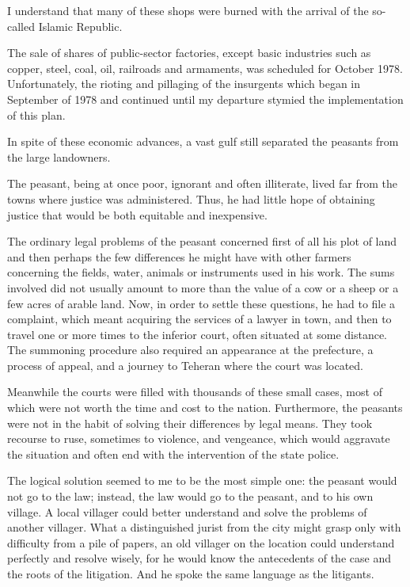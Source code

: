 I understand that many of these shops were burned with the arrival of the so-called Islamic Republic. 

The sale of shares of public-sector factories, except basic industries such as copper, steel, coal, oil, railroads and armaments, was scheduled for October 1978. Unfortunately, the rioting and pillaging of the insurgents which began in September of 1978 and continued until my departure stymied the implementation of this plan. 


In spite of these economic advances, a vast gulf still separated the peasants from the large landowners. 


The peasant, being at once poor, ignorant and often illiterate, lived far from the towns where justice was administered. Thus, he had little hope of obtaining justice that would be both equitable and inexpensive. 

The ordinary legal problems of the peasant concerned first of all his plot of land and then perhaps the few differences he might have with other farmers concerning the fields, water, animals or instruments used in his work. The sums involved did not usually amount to more than the value of a cow or a sheep or a few acres of arable land. Now, in order to settle these questions, he had to file a complaint, which meant acquiring the services of a lawyer in town, and then to travel one or more times to the inferior court, often situated at some distance. The summoning procedure also required an appearance at the prefecture, a process of appeal, and a journey to Teheran where the court was located. 

Meanwhile the courts were filled with thousands of these small cases, most of which were not worth the time and cost to the nation. Furthermore, the peasants were not in the habit of solving their differences by legal means. They took recourse to ruse, sometimes to violence, and vengeance, which would aggravate the situation and often end with the intervention of the state police. 

The logical solution seemed to me to be the most simple one: the peasant would not go to the law; instead, the law would go to the peasant, and to his own village. A local villager could better understand and solve the problems of another villager. What a distinguished jurist from the city might grasp only with difficulty from a pile of papers, an old villager on the location could understand perfectly and resolve wisely, for he would know the antecedents of the case and the roots of the litigation. And he spoke the same language as the litigants. 

